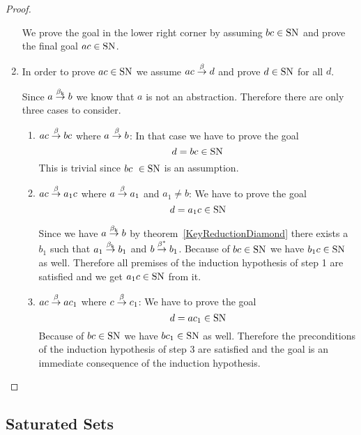 \begin{theorem}
\begin{proof}
\begin{enumerate}
            We prove the goal in the lower right corner by assuming $bc \in \SN$
                and prove the final goal $ac \in \text{SN}$.

        \item In order to prove $ac \in \text{SN}$ we assume $ac \stackrel{\beta}{\to} d$ and prove
            $d \in \text{SN}$ for all $d$.

            Since $a \stackrel{\beta_{\text{k}}}{\to} b$ we know that $a$ is not an abstraction.
            Therefore there are only three cases to consider.
            \begin{enumerate}
            \item $ac \stackrel{\beta}{\to} bc$ where $a \stackrel{\beta}{\to} b$: In that case we have to
                prove the goal
                $$
                    d = bc \in \text{SN}
                $$
                This is trivial since $bc \in \SN$ is an assumption.

            \item $ac \stackrel{\beta}{\to} a_1c$ where $a \stackrel{\beta}{\to} a_1$ and $a_1 \ne b$: We
                have to prove the goal
                $$
                    d = a_1 c \in \text{SN}
                $$

                Since we have $a \stackrel{\beta_{\text{k}}}{\to} b$ by
                theorem~\ref{KeyReductionDiamond} there exists a $b_1$ such
                that $a_1 \stackrel{\beta_{\text{k}}}{\to} b_1$ and $b \stackrel{\beta^*}{\to} b_1$. Because of
                $bc \in \SN$ we have $b_1c \in \text{SN}$ as well. Therefore all
                premises of the induction hypothesis of step 1 are satisfied and
                we get $a_1 c \in \text{SN}$ from it.

            \item $ac \stackrel{\beta}{\to} ac_1$ where $c \stackrel{\beta}{\to} c_1$: We have to prove the
                goal
                $$
                    d = a c_1 \in \text{SN}
                $$
                Because of $bc \in \SN$ we have $bc_1 \in \text{SN}$ as well.
                    Therefore the preconditions of the induction hypothesis of
                    step 3 are satisfied and the goal is an immediate
                    consequence of the induction hypothesis.
            \end{enumerate}
        \end{enumerate}
    \end{proof}
\end{theorem}








\subsection{Saturated Sets}






